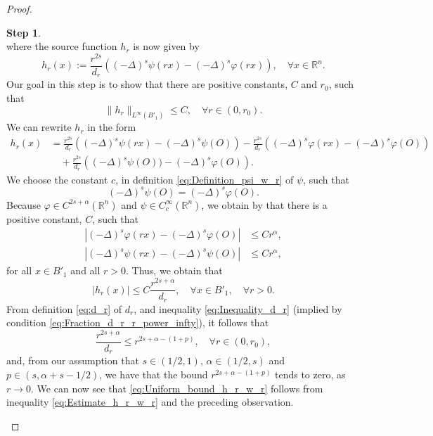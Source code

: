 \documentclass[11pt,reqno]{amsart}
\theoremstyle{definition}
\newtheorem{step}{Step}
\theoremstyle{remark}
\begin{document}
\begin{proof}
\begin{step}
\begin{equation}
\end{equation}
where the source function $h_r$ is now given by
\begin{equation}
\label{eq:Definition_h_r_w_r}
h_r(x):=\frac{r^{2s}}{d_r}\left((-\Delta)^s\psi(rx)-(-\Delta)^s\varphi(rx)\right),\quad\forall x\in{\mathbb{R}}^n.
\end{equation}
Our goal in this step is to show that there are positive constants, $C$ and $r_0$, such that
\begin{equation}
\label{eq:Uniform_bound_h_r_w_r}
\|h_r\|_{L^{\infty}(B'_1)} \leq C,\quad\forall r\in (0,r_0).
\end{equation}
We can rewrite $h_r$ in the form
\begin{align*}
h_r(x)
&= \frac{r^{2s}}{d_r} \left((-\Delta)^s\psi(rx) - (-\Delta)^s\psi(O)\right) 
- \frac{r^{2s}}{d_r} \left((-\Delta)^s\varphi(rx) - (-\Delta)^s\varphi(O)\right)\\
&\quad+\frac{r^{2s}}{d_r} \left((-\Delta)^s\psi(O)) - (-\Delta)^s\varphi(O)\right).
\end{align*}
We choose the constant $c$, in definition \eqref{eq:Definition_psi_w_r} of $\psi$, such that
$$
(-\Delta)^s\psi(O) = (-\Delta)^s\varphi(O).
$$
Because $\varphi \in C^{2s+\alpha}({\mathbb{R}}^n)$ and $\psi\in C^{\infty}_c({\mathbb{R}}^n)$, we obtain by \cite[Proposition 2.6]{Silvestre_2007} that there is a positive constant, $C$, such that
\begin{align*}
\left|(-\Delta)^s\varphi(rx) - (-\Delta)^s\varphi(O)\right|&\leq C r^{\alpha},\\
\left|(-\Delta)^s\psi(rx) - (-\Delta)^s\psi(O)\right|&\leq C r^{\alpha},
\end{align*}
for all $x \in B'_1$ and all $r>0$. Thus, we obtain that 
\begin{equation}
\label{eq:Estimate_h_r_w_r}
|h_r(x)| \leq C\frac{r^{2s+\alpha}}{d_r},\quad\forall x\in B'_1,\quad \forall r>0.
\end{equation}
From definition \eqref{eq:d_r} of $d_r$, and inequality \eqref{eq:Inequality_d_r} (implied by condition \eqref{eq:Fraction_d_r_r_power_infty}), it follows that
$$
\frac{r^{2s+\alpha}}{d_r} \leq r^{2s+\alpha-(1+p)},\quad\forall r\in (0,r_0),
$$
and, from our assumption that $s\in (1/2,1)$, $\alpha\in (1/2,s)$ and $p \in (s,\alpha+s-1/2)$, we have that the bound $r^{2s+\alpha-(1+p)}$ tends to zero, as $r\rightarrow 0$. We can now see that \eqref{eq:Uniform_bound_h_r_w_r} follows from inequality \eqref{eq:Estimate_h_r_w_r} and the preceding observation.
\end{step}


\end{proof}
\end{document}
